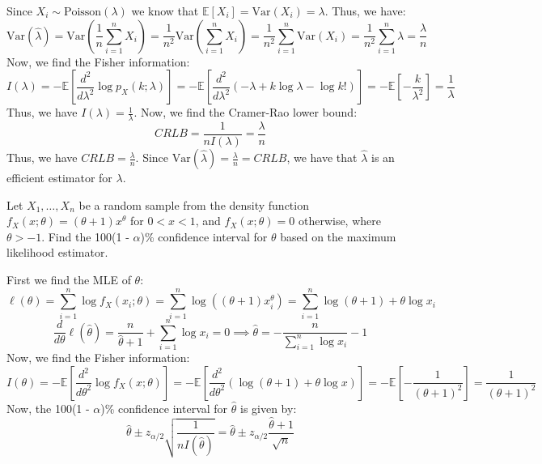 \documentclass{article}
\newcommand{\E}{\mathbb{E}}
\newcommand{\V}{\text{Var}}
\begin{document}
\begin{probset}
\begin{prob}[\textbf{5.5.2}]
    \begin{soln}
        Since $X_i \sim \text{Poisson}(\lambda)$ we know that $\E[X_i] = \V(X_i) = \lambda$. Thus, we have:
        \[
            \V(\hat\lambda) = \V\left(\frac{1}{n} \sum_{i=1}^n X_i\right) = \frac{1}{n^2} \V\left(\sum_{i=1}^n X_i\right) = \frac{1}{n^2} \sum_{i=1}^n \V(X_i) = \frac{1}{n^2} \sum_{i=1}^n \lambda = \frac{\lambda}{n}
        \]
        Now, we find the Fisher information:
        \[
            I(\lambda) = -\E\left[\frac{d^2}{d\lambda^2} \log p_X(k; \lambda)\right] = -\E\left[\frac{d^2}{d\lambda^2} \left( -\lambda + k \log \lambda - \log k!\right)\right] = -\E\left[-\frac{k}{\lambda^2}\right] = \frac{1}{\lambda}
        \]
        Thus, we have $I(\lambda) = \frac{1}{\lambda}$. Now, we find the Cramer-Rao lower bound:
        \[
            CRLB = \frac{1}{nI(\lambda)} = \frac{\lambda}{n}
        \]
        Thus, we have $CRLB = \frac{\lambda}{n}$. Since $\V(\hat\lambda) = \frac{\lambda}{n} = CRLB$, we have that $\hat\lambda$ is an efficient estimator for $\lambda$.
    \end{soln}
\end{prob}

\newpage

\begin{prob}
    Let $X_1, \ldots, X_n$ be a random sample from the density function $f_X(x; \theta) = (\theta + 1)x^\theta$ for $0 < x < 1$, and $f_X(x; \theta) = 0$ otherwise, where $\theta > -1$. Find the 100(1 - $\alpha$)\% confidence interval for $\theta$ based on the maximum likelihood estimator.

    \begin{soln}
        First we find the MLE of $\theta$:
        \[
            \ell(\theta) = \sum_{i=1}^n \log f_X(x_i; \theta) = \sum_{i=1}^n \log \left( (\theta + 1)x_i^\theta \right) = \sum_{i=1}^n \log(\theta + 1) + \theta \log x_i
        \]
        \[
            \frac{d}{d\theta} \ell(\hat\theta) = \frac{n}{\hat\theta + 1} + \sum_{i=1}^n \log x_i = 0 \implies \hat\theta = -\frac{n}{\sum_{i=1}^n \log x_i} - 1
        \]
        Now, we find the Fisher information:
        \[
            I(\theta) = -\E\left[\frac{d^2}{d\theta^2} \log f_X(x; \theta)\right] = -\E\left[\frac{d^2}{d\theta^2} \left( \log(\theta + 1) + \theta \log x \right)\right] = -\E\left[-\frac{1}{(\theta + 1)^2}\right] = \frac{1}{(\theta + 1)^2}
        \]
        Now, the 100(1 - $\alpha$)\% confidence interval for $\hat\theta$ is given by:
        \[
            \hat\theta \pm z_{\alpha/2} \sqrt{\frac{1}{nI(\hat\theta)}} = \hat\theta \pm z_{\alpha/2} \frac{\hat\theta + 1}{\sqrt{n}}
        \]
    \end{soln}
\end{prob}
\end{probset}
\end{document}
